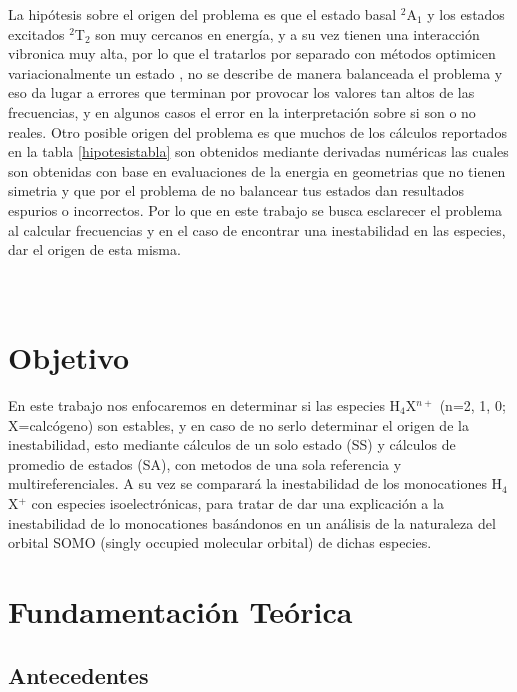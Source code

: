 \documentclass[12pt]{report}
\begin{document}
La hipótesis sobre el origen del problema es que el estado basal $^2$A$_1$ y los estados excitados $^2$T$_2$ son muy cercanos en energía, y a su vez tienen una interacción vibronica muy alta, por lo que el tratarlos por separado con métodos optimicen variacionalmente un estado
, no se describe de manera balanceada el problema y eso da lugar a errores que terminan por provocar los valores tan altos de las frecuencias, y en algunos casos el error en la interpretación sobre si son o no reales. Otro posible origen del problema es que muchos de los cálculos reportados en la tabla \ref{hipotesistabla} son obtenidos mediante derivadas numéricas 
las cuales son obtenidas con base en evaluaciones de la energia en geometrias que no tienen simetria y que por el problema de no balancear tus estados dan resultados espurios o incorrectos. Por lo que en este trabajo se busca esclarecer el problema al calcular frecuencias y en el caso de encontrar una inestabilidad en las especies, dar el origen de esta misma.
\\
\\
\\

\chapter{Objetivo }

En este trabajo nos enfocaremos en determinar si las especies H$_4$X$^{n+}$ (n=2, 1, 0; X=calcógeno) son estables, y en caso de no serlo determinar el origen de la inestabilidad, esto mediante cálculos de un solo estado (SS) y cálculos de promedio de estados (SA), con metodos de una sola referencia y multireferenciales. A su vez se comparará la inestabilidad de los monocationes H$_4$X$^+$ con especies isoelectrónicas, para tratar de dar una explicación a la inestabilidad de lo monocationes basándonos en un análisis de la naturaleza del orbital SOMO (singly occupied molecular orbital)
de dichas especies.

\newpage
\chapter{Fundamentación Teórica }
\section{Antecedentes}
\end{document}
